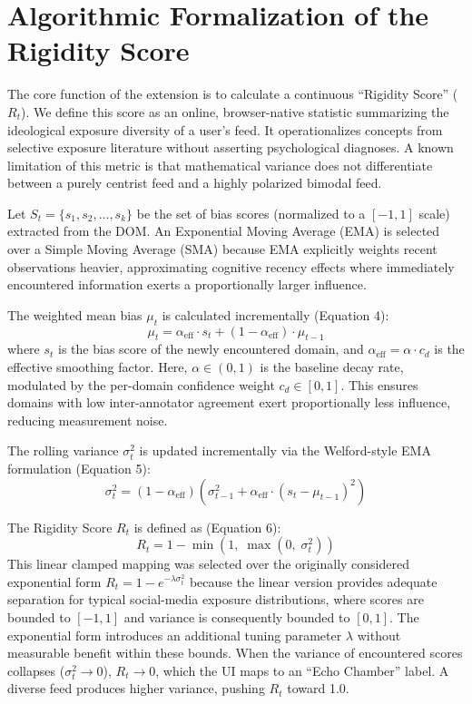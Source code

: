 \documentclass[10pt, conference, compsoc]{IEEEtran}
\begin{document}

\section{Algorithmic Formalization of the Rigidity Score}
The core function of the extension is to calculate a continuous ``Rigidity Score'' ($R_t$). We define this score as an online, browser-native statistic summarizing the ideological exposure diversity of a user's feed. It operationalizes concepts from selective exposure literature without asserting psychological diagnoses. A known limitation of this metric is that mathematical variance does not differentiate between a purely centrist feed and a highly polarized bimodal feed.

Let $S_t = \{s_1, s_2, \dots, s_k\}$ be the set of bias scores (normalized to a $[-1, 1]$ scale) extracted from the DOM. An Exponential Moving Average (EMA) is selected over a Simple Moving Average (SMA) because EMA explicitly weights recent observations heavier, approximating cognitive recency effects where immediately encountered information exerts a proportionally larger influence.

The weighted mean bias $\mu_t$ is calculated incrementally (Equation 4):
\begin{equation}
\mu_t = \alpha_{\text{eff}} \cdot s_t + (1 - \alpha_{\text{eff}}) \cdot \mu_{t-1}
\end{equation}
where $s_t$ is the bias score of the newly encountered domain, and $\alpha_{\text{eff}} = \alpha \cdot c_d$ is the effective smoothing factor. Here, $\alpha \in (0, 1)$ is the baseline decay rate, modulated by the per-domain confidence weight $c_d \in [0, 1]$. This ensures domains with low inter-annotator agreement exert proportionally less influence, reducing measurement noise.

The rolling variance $\sigma^2_t$ is updated incrementally via the Welford-style EMA formulation (Equation 5):
\begin{equation}
\sigma^2_t = (1 - \alpha_{\text{eff}}) \left( \sigma^2_{t-1} + \alpha_{\text{eff}} \cdot (s_t - \mu_{t-1})^2 \right)
\end{equation}

The Rigidity Score $R_t$ is defined as (Equation 6):
\begin{equation}
R_t = 1 - \min(1,\; \max(0,\; \sigma^2_t))
\end{equation}
This linear clamped mapping was selected over the originally considered exponential form $R_t = 1 - e^{-\lambda \sigma^2_t}$ because the linear version provides adequate separation for typical social-media exposure distributions, where scores are bounded to $[-1, 1]$ and variance is consequently bounded to $[0, 1]$. The exponential form introduces an additional tuning parameter $\lambda$ without measurable benefit within these bounds. When the variance of encountered scores collapses ($\sigma^2_t \to 0$), $R_t \to 0$, which the UI maps to an ``Echo Chamber'' label. A diverse feed produces higher variance, pushing $R_t$ toward 1.0.
\end{document}
